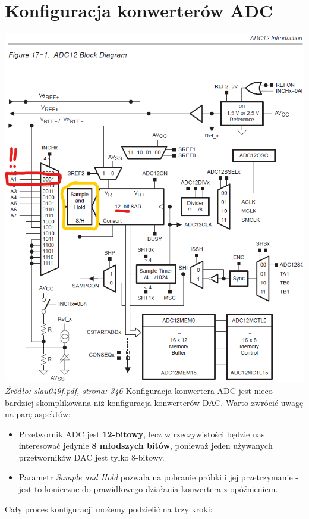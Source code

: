 \documentclass{article}
\begin{document}
\section{Konfiguracja konwerterów ADC}
\includegraphics[width=\textwidth]{"../img/slau049f_346.png"} \\
\textit{Źródło: slau049f.pdf, strona: 346}
\newpage
Konfiguracja konwertera ADC jest nieco bardziej skomplikowana niż konfiguracja konwerterów DAC. Warto zwrócić uwagę na parę aspektów:
\begin{itemize}
    \item Przetwornik ADC jest \textbf{12-bitowy}, lecz w rzeczywistości będzie nas interesować jedynie \textbf{8 młodszych bitów}, ponieważ jeden używanych przetworników DAC jest tylko 8-bitowy.
    \item Parametr \textit{Sample and Hold} pozwala na pobranie próbki i jej przetrzymanie - jest to konieczne do prawidłowego działania konwertera z opóźnieniem.
\end{itemize}
Cały proces konfiguracji możemy podzielić na trzy kroki:
\end{document}
